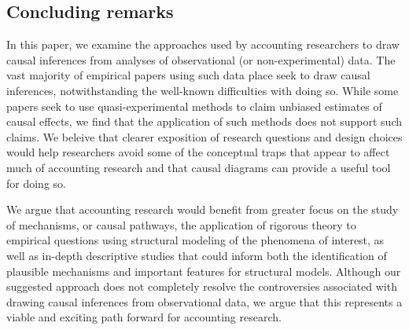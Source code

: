 \documentclass[11pt,reqno]{amsart}
\begin{document}
\begin{doublespace}

%
%
%

\section{Concluding remarks}
In this paper, we examine the approaches used by accounting researchers to draw causal inferences from analyses of observational (or non-experimental) data. 
The vast majority of empirical papers using such data place seek to draw causal inferences, notwithstanding the well-known difficulties with doing so.
While some papers seek to use quasi-experimental methods to claim unbiased estimates of causal effects, we find that the application of such methods does not support such claims.
We beleive that clearer exposition of research questions and design choices would help researchers avoid some of the conceptual traps that appear to affect much of accounting research and that causal diagrams can provide a useful tool for doing so.

We argue that  accounting research would benefit from greater focus on the study of  mechanisms, or causal pathways, the application of rigorous theory to empirical questions using  structural modeling of the phenomena of interest, as well as in-depth descriptive studies that could inform both the identification of plausible mechanisms and important features for structural models.
Although our suggested approach does not completely resolve the controversies associated with drawing causal inferences from observational data, we argue that this represents a viable and exciting path forward for accounting research.

\end{doublespace}

\clearpage


\clearpage



\clearpage

\end{document}
